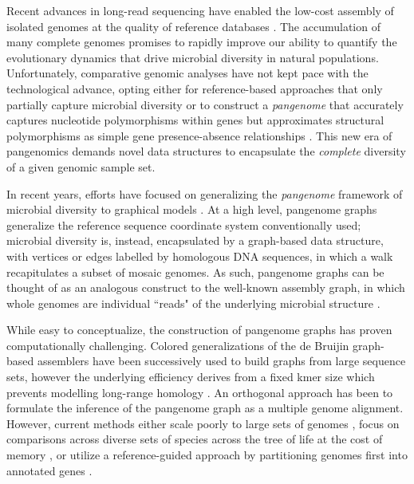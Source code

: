 \documentclass[aps,rmp,reprint,superscriptaddress,notitlepage,10pt]{revtex4-1}
\begin{document}
Recent advances in long-read sequencing have enabled the low-cost assembly of isolated genomes at the quality of reference databases \cite{whibley2021changing}.
The accumulation of many complete genomes promises to rapidly improve our ability to quantify the evolutionary dynamics that drive microbial diversity in natural populations.
Unfortunately, comparative genomic analyses have not kept pace with the technological advance, opting either for reference-based approaches that only partially capture microbial diversity \cite{tettelin2008comparative}  or to construct a \emph{pangenome} that accurately captures nucleotide polymorphisms within genes but approximates structural polymorphisms as simple gene presence-absence relationships \cite{page2015roary,ding2018panx} .
This new era of pangenomics demands novel data structures to encapsulate the \emph{complete} diversity of a given genomic sample set.

In recent years, efforts have focused on generalizing the \emph{pangenome} framework of microbial diversity to graphical models \cite{eizenga2020pangenome}.
At a high level, pangenome graphs generalize the reference sequence coordinate system conventionally used; microbial diversity is, instead, encapsulated by a graph-based data structure, with vertices or edges labelled by homologous DNA sequences, in which a walk recapitulates a subset of mosaic genomes.
As such, pangenome graphs can be thought of as an analogous construct to the well-known assembly graph, in which whole genomes are individual ``reads" of the underlying microbial structure \cite{myers2005fragment}.

While easy to conceptualize, the construction of pangenome graphs has proven computationally challenging.
Colored generalizations of the de Bruijin graph-based assemblers have been successively used to build graphs from large sequence sets, however the underlying efficiency derives from a fixed kmer size which prevents modelling long-range homology \cite{iqbal2012novo,muggli2017succinct}.
An orthogonal approach has been to formulate the inference of the pangenome graph as a multiple genome alignment.
However, current methods either scale poorly to large sets of genomes \cite{darling2010progressivemauve}, focus on comparisons across diverse sets of species across the tree of life at the cost of memory \cite{armstrong2020progressive}, or utilize a reference-guided approach by partitioning genomes first into annotated genes \cite{gautreau2020ppanggolin,colquhoun2021pandora}.
\end{document}
